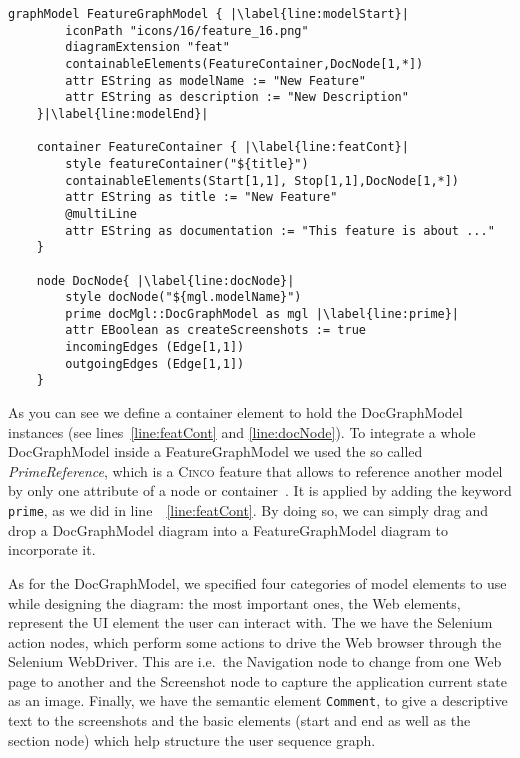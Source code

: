 \begin{lstlisting}[language=MGL, caption={Excerpt from the feature.mgl, meta-specification of the FeatureGraphModel}, label=docMGL, escapechar=|]
    graphModel FeatureGraphModel { |\label{line:modelStart}|
        iconPath "icons/16/feature_16.png"
        diagramExtension "feat"
        containableElements(FeatureContainer,DocNode[1,*])
        attr EString as modelName := "New Feature"
        attr EString as description := "New Description"
    }|\label{line:modelEnd}|
    
    container FeatureContainer { |\label{line:featCont}|
        style featureContainer("${title}")
        containableElements(Start[1,1], Stop[1,1],DocNode[1,*])
        attr EString as title := "New Feature"
        @multiLine
        attr EString as documentation := "This feature is about ..."
    }
    
    node DocNode{ |\label{line:docNode}|
        style docNode("${mgl.modelName}")
        prime docMgl::DocGraphModel as mgl |\label{line:prime}|
        attr EBoolean as createScreenshots := true
        incomingEdges (Edge[1,1])
        outgoingEdges (Edge[1,1])
    }
\end{lstlisting}

As you can see we define a container element to hold the DocGraphModel instances (see lines~\ref{line:featCont} and \ref{line:docNode}). To integrate a whole DocGraphModel inside a FeatureGraphModel we used the so called \textit{PrimeReference}, which is a \textsc{Cinco} feature that allows to reference another model by only one attribute of a node or container~\cite{Cinco}. It is applied by adding the keyword \lstinline[language=MGL]{prime}, as we did in line~~\ref{line:featCont}. By doing so, we can simply drag and drop a DocGraphModel diagram into a FeatureGraphModel diagram to incorporate it.

As for the DocGraphModel, we specified four categories of model elements to use while designing the diagram: the most important ones, the Web elements, represent the UI element the user can interact with. The we have the Selenium action nodes, which perform some actions to drive the Web browser through the Selenium WebDriver. This are i.e.~the Navigation node to change from one Web page to another and the Screenshot node to capture the application current state as an image. Finally, we have the semantic element \lstinline{Comment}, to give a descriptive text to the screenshots and the basic elements (start and end as well as the section node) which help structure the user sequence graph.

